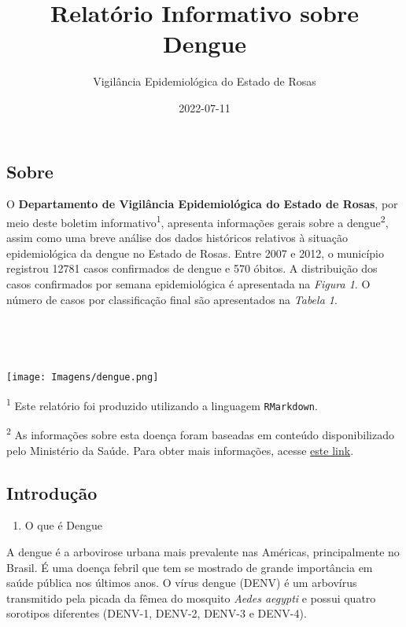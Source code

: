 \documentclass[
]{article}
\title{Relatório Informativo sobre Dengue}
\author{Vigilância Epidemiológica do Estado de Rosas}
\date{2022-07-11}
\providecommand{\tightlist}{%
  \setlength{\itemsep}{0pt}\setlength{\parskip}{0pt}}
\begin{document}
\maketitle

\subsection{Sobre}\label{sobre}

O \textbf{Departamento de Vigilância Epidemiológica do Estado de Rosas},
por meio deste boletim informativo\textsuperscript{1}, apresenta
informações gerais sobre a dengue\textsuperscript{2}, assim como uma
breve análise dos dados históricos relativos à situação epidemiológica
da dengue no Estado de Rosas. Entre 2007 e 2012, o município registrou
12781 casos confirmados de dengue e 570 óbitos. A distribuição dos casos
confirmados por semana epidemiológica é apresentada na \emph{Figura 1}.
O número de casos por classificação final são apresentados na
\emph{Tabela 1}.

~

~

\texttt{[image: Imagens/dengue.png]}

\textsuperscript{1} Este relatório foi produzido utilizando a linguagem
\texttt{RMarkdown}.

\textsuperscript{2} As informações sobre esta doença foram baseadas em
conteúdo disponibilizado pelo Ministério da Saúde. Para obter mais
informações, acesse
\href{https://www.gov.br/saude/pt-br/assuntos/saude-de-a-a-z/d/dengue}{este
link}.

\newpage

\subsection{Introdução}\label{introduuxe7uxe3o}

\begin{enumerate}
\def\labelenumi{\arabic{enumi}.}
\tightlist
\item
  O que é Dengue
\end{enumerate}

A dengue é a arbovirose urbana mais prevalente nas Américas,
principalmente no Brasil. É uma doença febril que tem se mostrado de
grande importância em saúde pública nos últimos anos. O vírus dengue
(DENV) é um arbovírus transmitido pela picada da fêmea do mosquito
\emph{Aedes aegypti} e possui quatro sorotipos diferentes (DENV-1,
DENV-2, DENV-3 e DENV-4).
\end{document}
